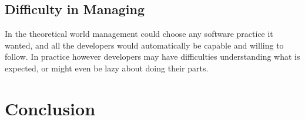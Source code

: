\documentclass{article}
\begin{document}
\subsection{Difficulty in Managing}

In the theoretical world management could choose any software practice it wanted, and all the developers would automatically be capable and willing to follow. In practice however developers may have difficulties understanding what is expected, or might even be lazy about doing their parts.

\section{Conclusion}




\end{document}
